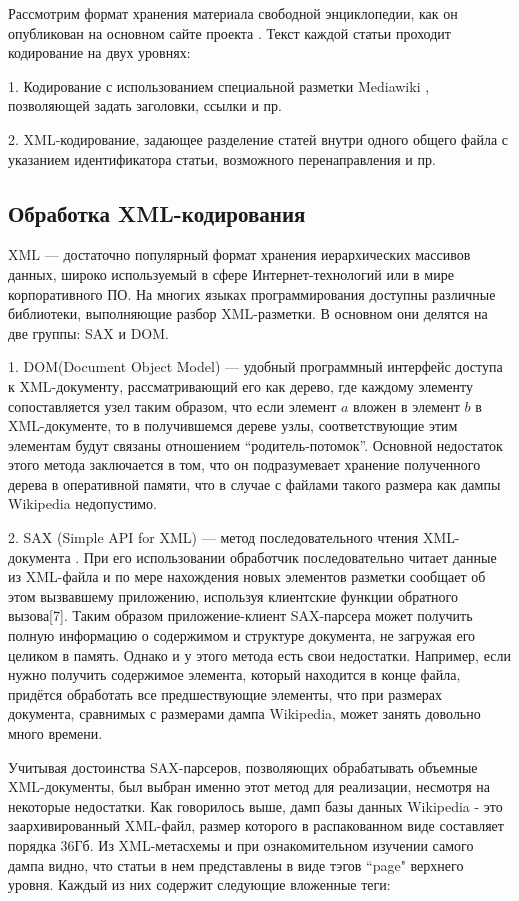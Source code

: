 Рассмотрим формат хранения материала свободной энциклопедии, как он
опубликован на основном сайте проекта \cite{download}. Текст каждой статьи проходит
кодирование на двух уровнях:

1. Кодирование с использованием специальной разметки Mediawiki \cite{wikimarkup},
позволяющей задать заголовки, ссылки и пр.

2. XML-кодирование, задающее разделение статей внутри одного общего
файла с указанием идентификатора статьи, возможного перенаправления и
пр.

\subsection{Обработка XML-кодирования}

XML --- достаточно популярный формат хранения иерархических массивов
данных, широко используемый в сфере Интернет-технологий или в мире
корпоративного ПО. На многих языках программирования доступны
различные библиотеки, выполняющие разбор XML-разметки. В основном они
делятся на две группы: SAX и DOM.

1. DOM(Document Object Model) \cite{dom} --- удобный программный интерфейс доступа 
к XML-документу, рассматривающий его как дерево, где каждому элементу 
сопоставляется узел таким образом, что если элемент $a$ вложен в элемент $b$ 
в XML-документе, то в получившемся дереве узлы, соответствующие этим элементам 
будут связаны отношением “родитель-потомок”.
Основной недостаток этого метода заключается в том, что он подразумевает хранение 
полученного дерева в оперативной памяти, что в случае с файлами такого размера 
как дампы Wikipedia недопустимо.

2. SAX (Simple API for XML) --- метод последовательного чтения XML-документа \cite{sax}. 
При его использовании обработчик последовательно читает данные
из XML-файла и по мере нахождения новых элементов разметки сообщает об этом вызвавшему приложению, 
используя клиентские функции обратного вызова[7]. Таким образом приложение-клиент 
SAX-парсера может получить полную информацию о содержимом и структуре документа,
не загружая его целиком в память. Однако и у этого метода есть свои недостатки. 
Например, если нужно получить содержимое элемента, который находится в конце файла,
придётся обработать все предшествующие элементы, что при размерах документа, сравнимых
с размерами дампа Wikipedia, может занять довольно много времени.

Учитывая достоинства SAX-парсеров, позволяющих обрабатывать объемные XML-документы, 
был выбран именно этот метод для реализации, несмотря на некоторые недостатки.
Как говорилось выше, дамп базы данных Wikipedia \cite{dump} - это заархивированный XML-файл, размер которого 
в распакованном виде составляет порядка 36Гб. Из XML-метасхемы \cite{schema} 
и при ознакомительном изучении самого дампа видно, что статьи в нем представлены в виде 
тэгов ``page" верхнего уровня. Каждый из них содержит следующие вложенные теги:

